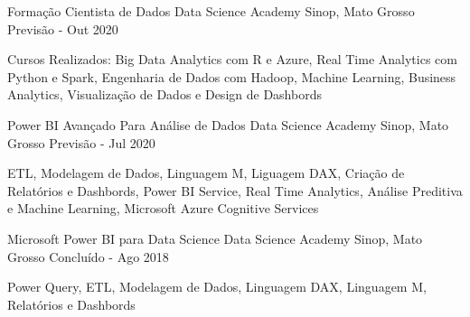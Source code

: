 \documentclass[11pt, letter]{awesome-cv}
\begin{document}
\vspace{-3mm}
\vspace{-2mm}
\begin{cventries}
	\cventry
	{Formação Cientista de Dados}
	{\vspace{3mm}Data Science Academy\vspace{-5mm}}
	{\vspace{3mm}Sinop, Mato Grosso\vspace{-5mm}}
	{Previsão - Out 2020}
	{
		\begin{cvitems}
			\vspace{-1mm}
			\item {Cursos Realizados: Big Data Analytics com R e Azure, Real Time Analytics com Python e Spark, Engenharia de Dados com Hadoop, Machine Learning, Business Analytics, Visualização de Dados e Design de Dashbords\vspace{-2mm}}
		\end{cvitems}
	}
	\cventry
	{Power BI Avançado Para Análise de Dados}
	{\vspace{3mm}Data Science Academy\vspace{-5mm}}
	{\vspace{3mm}Sinop, Mato Grosso\vspace{-5mm}}
	{Previsão -  Jul 2020}
	{
		\begin{cvitems}
			\vspace{-1mm}
			\item {ETL, Modelagem de Dados, Linguagem M, Liguagem DAX, Criação de Relatórios e Dashbords, Power BI Service, Real Time Analytics, Análise Preditiva e Machine Learning, Microsoft Azure Cognitive Services\vspace{-2mm}}
		\end{cvitems}
	}
	\cventry
	{Microsoft Power BI para Data Science}
	{\vspace{3mm}Data Science Academy\vspace{-5mm}}
	{\vspace{3mm}Sinop, Mato Grosso\vspace{-5mm}}
	{Concluído - Ago 2018}
	{
		\begin{cvitems}
			\vspace{-2mm}
			\item {Power Query, ETL, Modelagem de Dados, Linguagem DAX, Linguagem M, Relatórios e Dashbords\vspace{-2mm}}
		\end{cvitems}
	}
\end{cventries}
\end{document}
